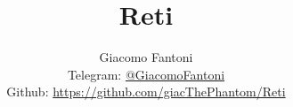 
\title{\Huge \textbf{Reti}}
\author{
  Giacomo Fantoni \\
  \small Telegram: \href{https://t.me/GiacomoFantoni}{@GiacomoFantoni} \\[3pt]
  \small Github: \href{https://github.com/giacThePhantom/Reti}{https://github.com/giacThePhantom/Reti}}

\maketitle
\tableofcontents







